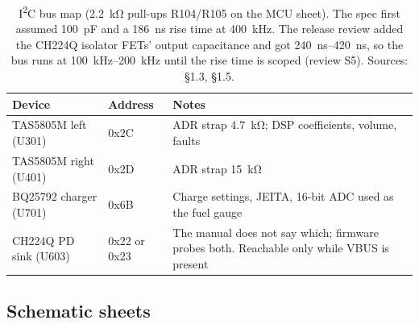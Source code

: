 \begin{table}[htbp]
\centering\small
\caption{I\textsuperscript{2}C bus map (\qty{2.2}{\kilo\ohm} pull-ups R104/R105 on the MCU sheet). The spec first assumed \qty{100}{\pico\farad} and a \qty{186}{\nano\second} rise time at \qty{400}{\kilo\hertz}. The release review added the CH224Q isolator FETs' output capacitance and got \qtyrange{240}{420}{\nano\second}, so the bus runs at \qtyrange{100}{200}{\kilo\hertz} until the rise time is scoped (review S5). Sources: \protect{} §1.3, \protect{} §1.5.}
\label{tab:i2c}
\begin{tabularx}{\linewidth}{@{}l l >{\raggedright\arraybackslash}X@{}}
\toprule
Device & Address & Notes \\
\midrule
TAS5805M left (U301) & 0x2C & ADR strap \qty{4.7}{\kilo\ohm}; DSP coefficients, volume, faults \\
TAS5805M right (U401) & 0x2D & ADR strap \qty{15}{\kilo\ohm} \\
BQ25792 charger (U701) & 0x6B & Charge settings, JEITA, 16-bit ADC used as the fuel gauge \\
CH224Q PD sink (U603) & 0x22 or 0x23 & The manual does not say which; firmware probes both. Reachable only while VBUS is present \\
\bottomrule
\end{tabularx}
\end{table}

\subsection{Schematic sheets}

